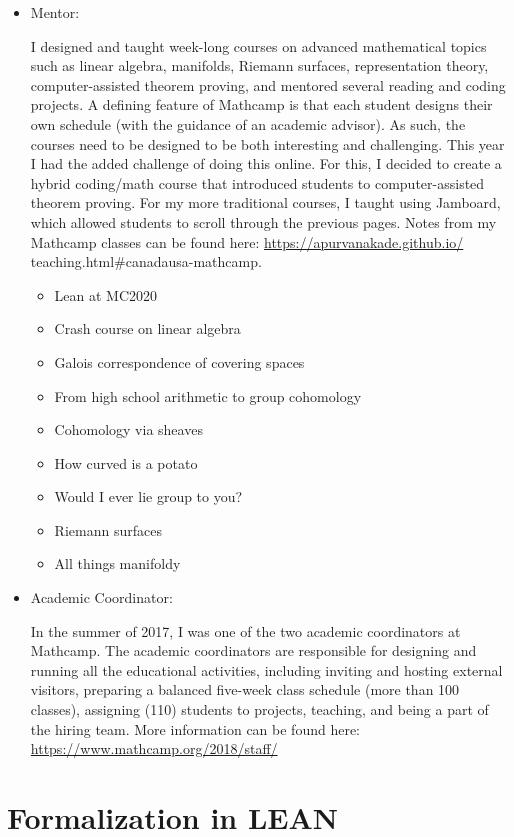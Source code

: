 \documentclass[
]{report}
\providecommand{\tightlist}{%
  \setlength{\itemsep}{0pt}\setlength{\parskip}{0pt}}
\begin{document}
\begin{itemize}
\item
  Mentor:

  I designed and taught week-long courses on advanced mathematical topics such as linear
  algebra, manifolds, Riemann surfaces, representation theory, computer-assisted theorem proving, and
  mentored several reading and coding projects. A defining feature of Mathcamp is that each student
  designs their own schedule (with the guidance of an academic advisor). As such, the courses need to
  be designed to be both interesting and challenging.
  This year I had the added challenge of doing this online. For this, I decided to create a hybrid
  coding/math course that introduced students to computer-assisted theorem proving. For my more
  traditional courses, I taught using Jamboard, which allowed students to scroll through the previous
  pages. Notes from my Mathcamp classes can be found here: \url{https://apurvanakade.github.io/}
  teaching.html\#canadausa-mathcamp.

  \begin{itemize}
  \tightlist
  \item
    Lean at MC2020
  \item
    Crash course on linear algebra
  \item
    Galois correspondence of covering spaces
  \item
    From high school arithmetic to group cohomology
  \item
    Cohomology via sheaves
  \item
    How curved is a potato
  \item
    Would I ever lie group to you?
  \item
    Riemann surfaces
  \item
    All things manifoldy
  \end{itemize}
\item
  Academic Coordinator:

  In the summer of 2017, I was one of the two academic coordinators at Mathcamp. The academic coordinators are responsible for designing and running all the educational
  activities, including inviting and hosting external visitors, preparing a balanced five-week class schedule (more than 100 classes), assigning (110) students to projects, teaching, and being a part of the hiring
  team. More information can be found here: \url{https://www.mathcamp.org/2018/staff/}
\end{itemize}

\hypertarget{formalization-in-lean}{%
\section{Formalization in LEAN}\label{formalization-in-lean}}
\end{document}
